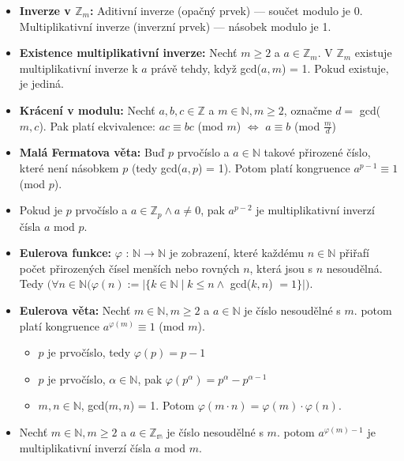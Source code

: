 \begin{itemize}
	\item \textbf{Inverze v $\mathbb{Z}_m$:} Aditivní inverze (opačný prvek) --- součet modulo je 0. Multiplikativní inverze (inverzní prvek) --- násobek modulo je 1.
	
	\item \textbf{Existence multiplikativní inverze:} Nechť $m \geq 2$ a $a \in \mathbb{Z}_m$. V $\mathbb{Z}_m$ existuje multiplikativní inverze k $a$ právě tehdy, když gcd($a, m$) = 1. Pokud existuje, je jediná. 
	
	\item \textbf{Krácení v modulu:} Nechť $a, b, c \in \mathbb{Z}$ a $m \in \mathbb{N}, m \geq 2$, označme $d =$ gcd($m, c$). Pak platí ekvivalence: $ac \equiv bc$ (mod $m$) $\Leftrightarrow$ $a \equiv b$ (mod $\frac{m}{d}$)
	
	\item \textbf{Malá Fermatova věta:} Buď $p$ prvočíslo a $a \in \mathbb{N}$ takové přirozené číslo, které není násobkem $p$ (tedy gcd($a, p$) = 1). Potom platí kongruence $a^{p-1} \equiv 1$ (mod $p$).
	
	\item Pokud je $p$ prvočíslo a $a \in \mathbb{Z}_p \land a \neq 0$, pak $a^{p-2}$ je multiplikativní inverzí čísla $a$ mod $p$. 
	
	\item \textbf{Eulerova funkce:} $\varphi$ : $\mathbb{N} \rightarrow \mathbb{N}$ je zobrazení, které každému $n \in \mathbb{N}$ přiřafí počet přirozených čísel menších nebo rovných $n$, která jsou s $n$ nesoudělná. Tedy $(\forall n \in \mathbb{N}(\varphi (n) := |\{k \in \mathbb{N} \mid k \leq n \land$ gcd($k, n$) $ = 1\}|)$.
	
	\item \textbf{Eulerova věta:} Nechť $m \in \mathbb{N}, m \geq 2$ a $a \in \mathbb{N}$ je číslo nesoudělné s $m$. potom platí kongruence $a^{\varphi(m)} \equiv 1$ (mod $m$).
	
	\begin{itemize}
		\item $p$ je prvočíslo, tedy $\varphi(p) = p - 1$
		\item $p$ je prvočíslo, $\alpha \in \mathbb{N}$, pak $\varphi(p^\alpha) = p^\alpha - p^{\alpha - 1}$
		\item $m, n \in \mathbb{N}$, gcd($m, n$) = 1. Potom $\varphi(m\cdot n) = \varphi(m) \cdot \varphi (n)$.
	\end{itemize}
	
	\item Nechť $m \in \mathbb{N}, m \geq 2$ a $a \in \mathbb{Z_m}$ je číslo nesoudělné s $m$. potom $a^{\varphi(m) - 1}$ je multiplikativní inverzí čísla $a$ mod $m$.
	

\end{itemize}
